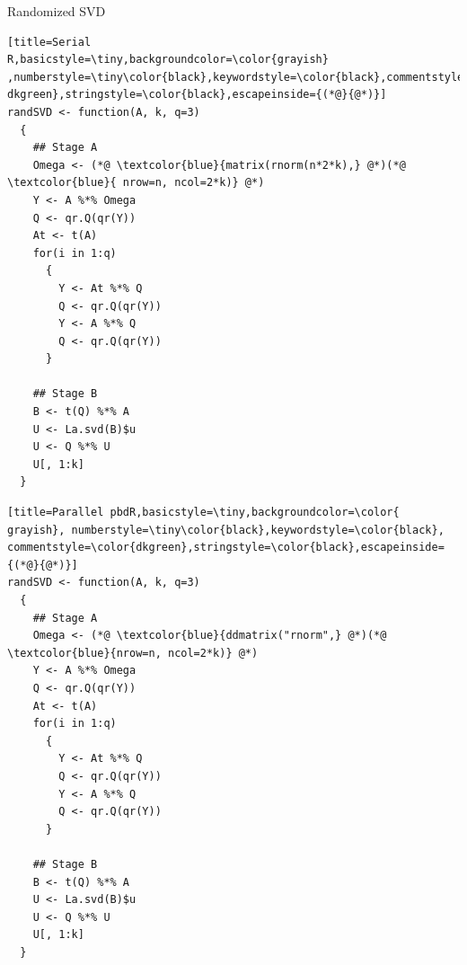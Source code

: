 \begin{frame}[fragile]
 \fontsize{8pt}{10}\selectfont
\begin{block}{Randomized SVD}
  \hfill
  \begin{minipage}{0.430\textwidth}
\begin{lstlisting}[title=Serial 
R,basicstyle=\tiny,backgroundcolor=\color{grayish} 
,numberstyle=\tiny\color{black},keywordstyle=\color{black},commentstyle=\color{ 
dkgreen},stringstyle=\color{black},escapeinside={(*@}{@*)}]
randSVD <- function(A, k, q=3)
  {
    ## Stage A
    Omega <- (*@ \textcolor{blue}{matrix(rnorm(n*2*k),} @*)(*@ \textcolor{blue}{ nrow=n, ncol=2*k)} @*)
    Y <- A %*% Omega
    Q <- qr.Q(qr(Y))
    At <- t(A)
    for(i in 1:q)
      {
        Y <- At %*% Q
        Q <- qr.Q(qr(Y))
        Y <- A %*% Q
        Q <- qr.Q(qr(Y))
      }
    
    ## Stage B
    B <- t(Q) %*% A
    U <- La.svd(B)$u
    U <- Q %*% U
    U[, 1:k]
  }
\end{lstlisting} %
  \end{minipage}
  \hfill
  \begin{minipage}{0.430\textwidth}
\begin{lstlisting}[title=Parallel pbdR,basicstyle=\tiny,backgroundcolor=\color{
grayish}, numberstyle=\tiny\color{black},keywordstyle=\color{black},
commentstyle=\color{dkgreen},stringstyle=\color{black},escapeinside={(*@}{@*)}]
randSVD <- function(A, k, q=3)
  {
    ## Stage A
    Omega <- (*@ \textcolor{blue}{ddmatrix("rnorm",} @*)(*@ \textcolor{blue}{nrow=n, ncol=2*k)} @*)
    Y <- A %*% Omega
    Q <- qr.Q(qr(Y))
    At <- t(A)      
    for(i in 1:q)
      {
        Y <- At %*% Q   
        Q <- qr.Q(qr(Y))
        Y <- A %*% Q    
        Q <- qr.Q(qr(Y))
      }
    
    ## Stage B
    B <- t(Q) %*% A     
    U <- La.svd(B)$u 
    U <- Q %*% U     
    U[, 1:k]
  }
\end{lstlisting}  %
  \end{minipage}
\hfill
\end{block}
\end{frame}

